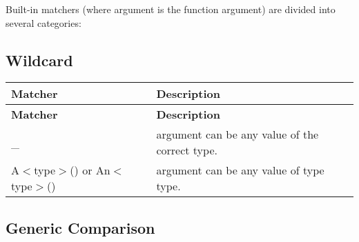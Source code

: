 Built-\/in matchers (where {\ttfamily argument} is the function argument) are divided into several categories\+:

\subsection*{Wildcard}

\tabulinesep=1mm
\begin{longtabu}spread 0pt [c]{*{2}{|X[-1]}|}
\hline
\cellcolor{\tableheadbgcolor}\textbf{ Matcher  }&\cellcolor{\tableheadbgcolor}\textbf{ Description   }\\
\endfirsthead
\hline
\endfoot
\hline
\cellcolor{\tableheadbgcolor}\textbf{ Matcher  }&\cellcolor{\tableheadbgcolor}\textbf{ Description   }\\
\endhead
{\ttfamily \+\_\+}  &{\ttfamily argument} can be any value of the correct type.   \\
{\ttfamily A$<$type$>$()} or {\ttfamily An$<$type$>$()}  &{\ttfamily argument} can be any value of type {\ttfamily type}.   \\
\end{longtabu}


\subsection*{Generic Comparison}

